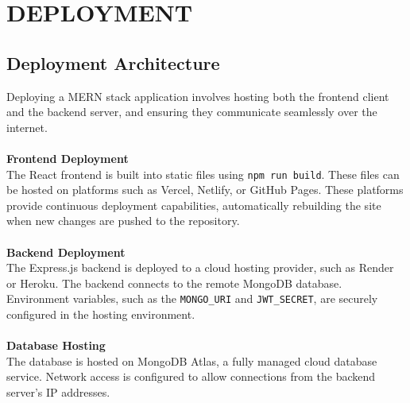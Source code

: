 \chapter{DEPLOYMENT}
\section{Deployment Architecture}
Deploying a MERN stack application involves hosting both the frontend client and the backend server, and ensuring they communicate seamlessly over the internet.
\\\\
\textbf{Frontend Deployment}\\
The React frontend is built into static files using \texttt{npm run build}. These files can be hosted on platforms such as Vercel, Netlify, or GitHub Pages. These platforms provide continuous deployment capabilities, automatically rebuilding the site when new changes are pushed to the repository.
\\\\
\textbf{Backend Deployment}\\
The Express.js backend is deployed to a cloud hosting provider, such as Render or Heroku. The backend connects to the remote MongoDB database. Environment variables, such as the \texttt{MONGO\_URI} and \texttt{JWT\_SECRET}, are securely configured in the hosting environment.
\\\\
\textbf{Database Hosting}\\
The database is hosted on MongoDB Atlas, a fully managed cloud database service. Network access is configured to allow connections from the backend server's IP addresses.